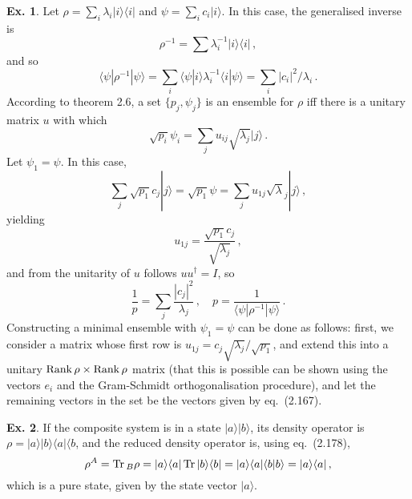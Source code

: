 \documentclass[a4paper,12pt]{article}
\def\Tr{\ensuremath{\mathop{\rm Tr}}{}}
\def\Rank{\ensuremath{\mathop{\rm Rank}}}
\theoremstyle{definition}
\newtheorem{exercise}{Ex.}[section]
\begin{document}
\begin{exercise}
 Let $\rho = \sum_i \lambda_i |i\rangle\langle i|$ and $\psi = \sum_i c_i |i\rangle$. In this case, the generalised inverse is
 \[
  \rho^{-1} = \sum \lambda_i^{-1} |i\rangle\langle i|\,,
 \]
 and so
 \[
  \langle \psi | \rho^{-1} | \psi \rangle = \sum_i \langle \psi | i\rangle \lambda_i^{-1} \langle i | \psi \rangle = \sum_i |c_i|^2/\lambda_i\,.
 \]
 According to theorem 2.6, a set $\{p_j, \psi_j\}$ is an ensemble for $\rho$ iff there is a unitary matrix $u$ with which
 \[
  \sqrt{p_i}\psi_i = \sum_j u_{ij}\sqrt{\lambda_j}|j\rangle\,.
 \]
 Let $\psi_1 = \psi$. In this case,
 \[
  \sum_j \sqrt{p_1} c_j |j\rangle = \sqrt{p_1} \psi = \sum_j u_{1j} \sqrt{\lambda}_j |j\rangle\,,
 \]
 yielding
 \[
  u_{1j} = \frac{\sqrt{p_1}c_j}{\sqrt{\lambda_j}}\,,
 \]
 and from the unitarity of $u$ follows $uu^\dagger=I$, so
 \[
  \frac{1}{p} = \sum_j\frac{|c_j|^2}{\lambda_j}\,,\quad p = \frac{1}{\langle \psi | \rho^{-1}|\psi\rangle}\,.
 \]
 Constructing a minimal ensemble with $\psi_1 = \psi$ can be done as follows: first, we consider a matrix whose first row is $u_{1j} = c_j \sqrt{\lambda_j}/\sqrt{p_1}$, and extend this into a unitary $\Rank \rho \times \Rank \rho$ matrix (that this is possible can be shown using the vectors $e_i$ and the Gram-Schmidt orthogonalisation procedure), and let the remaining vectors in the set be the vectors given by eq.\ (2.167).
\end{exercise}

\begin{exercise}
 If the composite system is in a state $|a\rangle |b\rangle$, its density operator is $\rho = |a\rangle |b\rangle \langle a |\langle b$, and the reduced density operator is, using eq.\ (2.178),
 \[
  \rho^A = \Tr_B \rho = |a\rangle\langle a| \Tr |b\rangle\langle b| = |a\rangle\langle a| \langle b | b\rangle = |a\rangle\langle a|\,,
 \]
 which is a pure state, given by the state vector $|a\rangle$.
\end{exercise}
\end{document}
